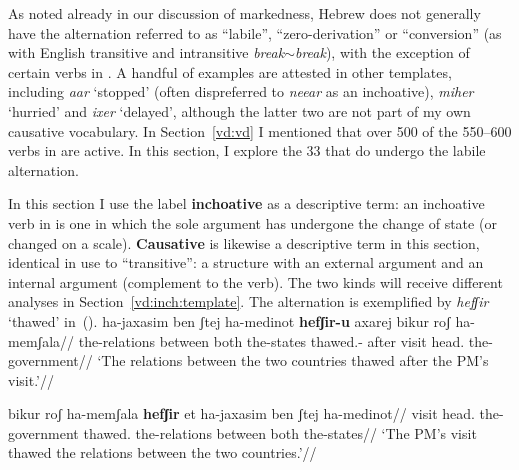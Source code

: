 As noted already in our discussion of markedness, Hebrew does not generally have the alternation referred to as ``labile'', ``zero-derivation'' or ``conversion'' (as with English transitive and intransitive \emph{break}$\sim$\emph{break}), with the exception of certain verbs in {\thif}. A handful of examples are attested in other templates, including \emph{a{\texttslig}ar} `stopped' (often dispreferred to \emph{nee{\texttslig}ar} as an inchoative), \emph{miher} `hurried' and \emph{ixer} `delayed', although the latter two are not part of my own causative vocabulary. In Section~\ref{vd:vd} I mentioned that over 500 of the 550--600 verbs in {\thif} are active. In this section, I explore the 33 that do undergo the labile alternation.

In this section I use the label \textbf{inchoative} as a descriptive term: an inchoative verb in {\thif} is one in which the sole argument has undergone the change of state (or changed on a scale). \textbf{Causative} is likewise a descriptive term in this section, identical in use to ``transitive'': a structure with an external argument and an internal argument (complement to the verb). The two kinds will receive different analyses in Section~\ref{vd:inch:template}. The alternation is exemplified by \emph{hefʃir} `thawed' in~(\nextx).
\pex\label{ex:vd:thif-hefSir}
	\a \begingl
		\gla ha-jaxasim ben ʃtej ha-medinot \textbf{hefʃir-u} axarej bikur roʃ ha-memʃala//
		\glb the-relations between both the-states thawed.- after visit head. the-government//
		\glft `The relations between the two countries thawed after the PM's visit.'//
		\endgl
	
	\a \begingl
		\gla bikur roʃ ha-memʃala \textbf{hefʃir} et ha-jaxasim ben ʃtej ha-medinot//
		\glb visit head. the-government thawed.  the-relations between both the-states//
		\glft `The PM's visit thawed the relations between the two countries.'//
		\endgl
\xe

